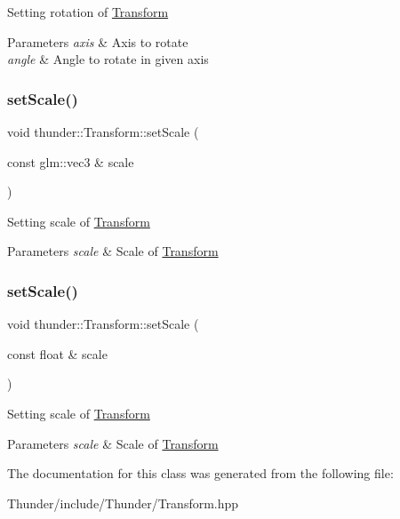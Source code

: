 Setting rotation of \mbox{\hyperlink{classthunder_1_1_transform}{Transform}}


\begin{DoxyParams}{Parameters}
{\em axis} & Axis to rotate \\
\hline
{\em angle} & Angle to rotate in given axis \\
\hline
\end{DoxyParams}
\mbox{\label{classthunder_1_1_transform_a8fe28dfa249e9b20bdc41fb5831fe365}} 
\subsubsection{\texorpdfstring{set\+Scale()}{setScale()}\hspace{0.1cm}{\footnotesize\ttfamily [1/2]}}
{\footnotesize\ttfamily void thunder\+::\+Transform\+::set\+Scale (\begin{DoxyParamCaption}\item[{const glm\+::vec3 \&}]{scale }\end{DoxyParamCaption})}

Setting scale of \mbox{\hyperlink{classthunder_1_1_transform}{Transform}}


\begin{DoxyParams}{Parameters}
{\em scale} & Scale of \mbox{\hyperlink{classthunder_1_1_transform}{Transform}} \\
\hline
\end{DoxyParams}
\mbox{\label{classthunder_1_1_transform_a8b94987c46bf380b9507a880ec64f2cc}} 
\subsubsection{\texorpdfstring{set\+Scale()}{setScale()}\hspace{0.1cm}{\footnotesize\ttfamily [2/2]}}
{\footnotesize\ttfamily void thunder\+::\+Transform\+::set\+Scale (\begin{DoxyParamCaption}\item[{const float \&}]{scale }\end{DoxyParamCaption})}

Setting scale of \mbox{\hyperlink{classthunder_1_1_transform}{Transform}}


\begin{DoxyParams}{Parameters}
{\em scale} & Scale of \mbox{\hyperlink{classthunder_1_1_transform}{Transform}} \\
\hline
\end{DoxyParams}


The documentation for this class was generated from the following file\+:\begin{DoxyCompactItemize}
\item 
Thunder/include/\+Thunder/Transform.\+hpp\end{DoxyCompactItemize}
